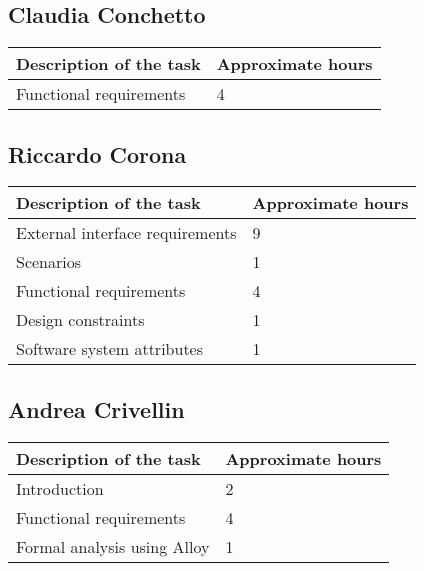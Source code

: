 
%

\subsection{Claudia Conchetto}
\begin{table}[h!]
\begin{tabular}{|l|l|}
\hline
\textbf{Description of the task} & \textbf{Approximate hours} \\ \hline
Functional requirements & 4 \\ \hline
\end{tabular}
\end{table}

\subsection{Riccardo Corona}
\begin{table}[h!]
\begin{tabular}{|l|l|}
\hline
\textbf{Description of the task} & \textbf{Approximate hours} \\ \hline
External interface requirements & 9 \\ \hline
Scenarios & 1 \\ \hline
Functional requirements & 4 \\ \hline
Design constraints & 1 \\ \hline
Software system attributes & 1 \\ \hline
\end{tabular}
\end{table}

\subsection{Andrea Crivellin}
\begin{table}[h!]
\begin{tabular}{|l|l|}
\hline
\textbf{Description of the task} & \textbf{Approximate hours} \\ \hline
Introduction & 2 \\ \hline
Functional requirements & 4 \\ \hline
Formal analysis using Alloy & 1 \\ \hline
\end{tabular}
\end{table}

%